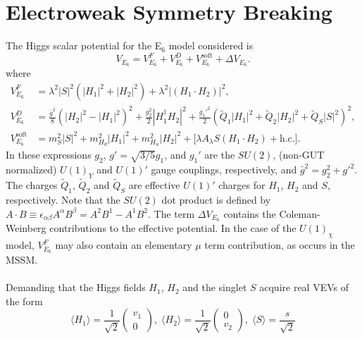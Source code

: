 \documentclass[preprint,amsmath,amssymb,aps,superscriptaddress,prd,showpacs,floatfix,nofootinbib]{revtex4-1}
\begin{document}
 



\section{\label{sec:ewsb}Electroweak Symmetry Breaking}
The Higgs scalar potential for the E$_6$ model considered is \cite{King:2005jy} 
\begin{equation}\label{eq:E6VeffOneLoop}
V_{E_6}=V_{E_6}^F+V_{E_6}^D+V_{E_6}^{\textrm{soft}}+\Delta V_{E_6}.
\end{equation}
where
\begin{align}
V_{E_6}^F&=\lambda^2|S|^2(|H_1|^2+|H_2|^2)+\lambda^2|(H_1\cdot
H_2)|^2,\label{eq:E6VFterms}\\ V_{E_6}^D&=\frac{\bar{g}^2}{8}\left (
|H_2|^2-|H_1|^2\right )^2+\frac{g_2^2}{2}|H_1^\dagger
H_2|^2+\frac{g_1'^2}{2}(\tilde{Q}_1|H_1|^2+\tilde{Q}_2|H_2|^2+\tilde{Q}_S|S|^2)^2,\label{eq:E6VDterms}\\ V_{E_6}^{\textrm{soft}}&=m_S^2|S|^2+m_{H_d}^2|H_1|^2+m_{H_u}^2|H_2|^2+\Big
[\lambda A_\lambda S(H_1\cdot H_2)+\textrm{h.c.}\Big
].\label{eq:E6Vsoft}
\end{align}
In these expressions $g_2$, $g'=\sqrt{3/5}g_1$, and $g_1'$ are the
$SU(2)$, (non-GUT normalized) $U(1)_Y$ and $U(1)'$ gauge couplings,
respectively, and $\bar{g}^2=g_2^2+g'^2$. The charges $\tilde{Q}_1$,
$\tilde{Q}_2$ and $\tilde{Q}_S$ are effective $U(1)'$ charges for
$H_1$, $H_2$ and $S$, respectively. Note that the $SU(2)$ dot product
is defined by $A\cdot B\equiv \epsilon_{\alpha\beta}A^\alpha
B^\beta=A^2B^1-A^1B^2$. The term $\Delta V_{E_6}$ contains the
Coleman-Weinberg contributions to the effective potential. In the case
of the $U(1)_\chi$ model, $V_{E_6}^F$ may also contain an elementary
$\mu$ term contribution, as occurs in the MSSM.\\ \\ Demanding that
the Higgs fields $H_1$, $H_2$ and the singlet $S$ acquire real VEVs of
the form
\begin{equation}\label{eq:E6vevs}
\langle H_1 \rangle = \frac{1}{\sqrt{2}}\begin{pmatrix} v_1 \\ 0\end{pmatrix}, \; \langle H_2 \rangle = \frac{1}{\sqrt{2}}\begin{pmatrix} 0 \\ v_2 \end{pmatrix}, \; \langle S \rangle =\frac{s}{\sqrt{2}}
\end{equation}
\end{document}
